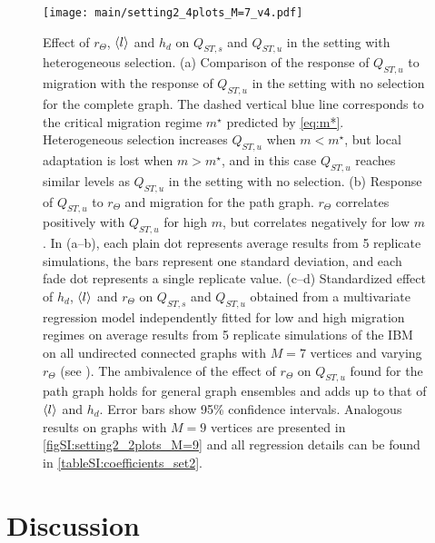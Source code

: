 \begin{figure}[ht] 
    \centering
      \texttt{[image: main/setting2\_4plots\_M=7\_v4.pdf]}
    \caption{ \small Effect of $r_\Theta$, $\langle l \rangle$ and $h_d$ on $Q_{ST,s}$ and $Q_{ST,u}$ in the setting with heterogeneous selection.
    (a) Comparison of the response of $Q_{ST,u}$ to migration with the response of $Q_{ST,u}$ in the setting with no selection for the complete graph. The dashed vertical blue line corresponds to the critical migration regime $m^\star$ predicted by \cref{eq:m*}. Heterogeneous selection increases $Q_{ST,u}$ when $m < m^\star$, but local adaptation is lost when $m > m^\star$, and in this case $Q_{ST,u}$ reaches similar levels as $Q_{ST,u}$ in the setting with no selection. 
    (b) Response of $Q_{ST,u}$ to $r_\Theta$ and migration for the path graph. $r_\Theta$ correlates positively with $Q_{ST,u}$ for high $m$, but correlates negatively for low $m$.
    In (a--b), each plain dot represents average results from 5 replicate simulations, the bars represent one standard deviation, and each fade dot represents a single replicate value.
    (c--d) Standardized effect of $h_d$, $\langle l \rangle$ and $r_\Theta$ on $Q_{ST,s}$ and $Q_{ST,u}$ obtained from a multivariate regression model independently fitted for low and high migration regimes on average results from 5 replicate simulations of the IBM on all undirected connected graphs with $M=7$ vertices and varying $r_\Theta$ (see ).
    The ambivalence of the effect of $r_\Theta$ on $Q_{ST,u}$ found for the path graph holds for general graph ensembles and adds up to that of $\langle l \rangle$ and $h_d$.
    Error bars show 95\% confidence intervals.
    Analogous results on graphs with $M=9$ vertices are presented in \cref{figSI:setting2_2plots_M=9} and all regression details can be found in \cref{tableSI:coefficients_set2}.
    }
    \label{fig:setting2_4plots_M=7}
\end{figure}

\clearpage

\section{Discussion}

